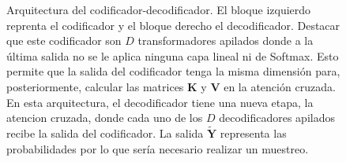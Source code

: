\begin{figure}[htbp]
    \centering
    \DiagramaCodificadorDecodificador
    \caption{Arquitectura del codificador-decodificador. El bloque izquierdo reprenta el codificador y el bloque derecho el decodificador. Destacar que este codificador son $D$ transformadores apilados donde a la última salida no se le aplica ninguna capa lineal ni de Softmax. Esto permite que la salida del codificador tenga la misma dimensión para, posteriormente, calcular las matrices $\mathbf{K}$ y $\mathbf{V}$ en la atención cruzada. En esta arquitectura, el decodificador tiene una nueva etapa, la atencion cruzada, donde cada uno de los $D$ decodificadores apilados recibe la salida del codificador. La salida $\widetilde{\mathbf{Y}}$ representa las probabilidades por lo que sería necesario  realizar un muestreo.}
    \label{fig:codificador_decodficador}
\end{figure}










































